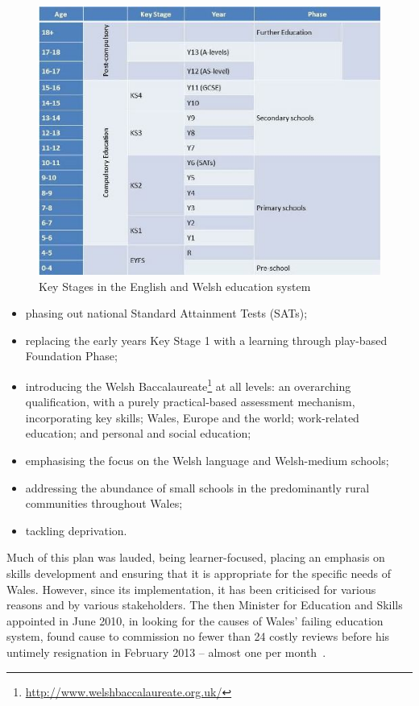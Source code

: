 \documentclass{sig-alternate}
\begin{document}
\begin{figure}[!ht]
  \centering
  \includegraphics[width=0.9\columnwidth]{images/keystages.png}
  \caption{Key Stages in the English and Welsh education system}
  \label{fig:key-stages}
\end{figure}

\begin{itemize}
\item phasing out national Standard Attainment Tests (SATs);
\item replacing the early years Key Stage 1 with a learning through
play-based Foundation Phase;
\item introducing the Welsh
Baccalaureate\footnote{\url{http://www.welshbaccalaureate.org.uk/}} at
all levels: an overarching qualification, with a purely
practical-based assessment mechanism, incorporating key skills; Wales,
Europe and the world; work-related education; and personal and social
education;
\item emphasising the focus on the Welsh language and Welsh-medium
schools;
\item addressing the abundance of small schools in the predominantly
rural communities throughout Wales;
\item tackling deprivation.
\end{itemize}

Much of this plan was lauded, being learner-focused, placing an
emphasis on skills development and ensuring that it is appropriate for
the specific needs of Wales. However, since its implementation, it has
been criticised for various reasons and by various stakeholders.  The
then Minister for Education and Skills appointed in June 2010, in
looking for the causes of Wales' failing education system, found cause
to commission no fewer than 24 costly reviews before his untimely
resignation in February 2013 -- almost one per
month~\cite{Evans:2015}.
\end{document}
